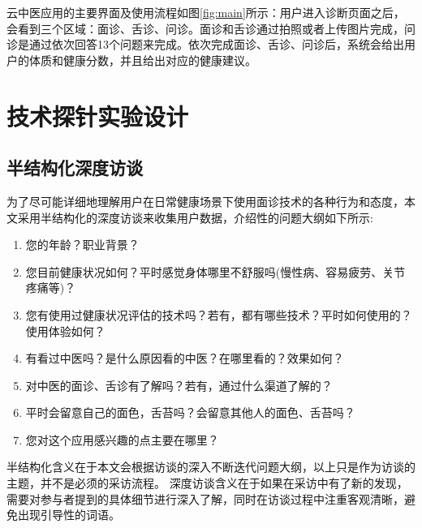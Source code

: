 云中医应用的主要界面及使用流程如图\ref{fig:main}所示：用户进入诊断页面之后，会看到三个区域：面诊、舌诊、问诊。面诊和舌诊通过拍照或者上传图片完成，问诊是通过依次回答13个问题来完成。依次完成面诊、舌诊、问诊后，系统会给出用户的体质和健康分数，并且给出对应的健康建议。

\section{技术探针实验设计}


\subsection{半结构化深度访谈}

为了尽可能详细地理解用户在日常健康场景下使用面诊技术的各种行为和态度，本文采用半结构化的深度访谈来收集用户数据\cite{DiciccoThe}，介绍性的问题大纲如下所示:
\begin{enumerate}
    \item 您的年龄？职业背景？
    \item 您目前健康状况如何？平时感觉身体哪里不舒服吗(慢性病、容易疲劳、关节疼痛等)？
    \item 您有使用过健康状况评估的技术吗？若有，都有哪些技术？平时如何使用的？使用体验如何？
    \item 有看过中医吗？是什么原因看的中医？在哪里看的？效果如何？
    \item 对中医的面诊、舌诊有了解吗？若有，通过什么渠道了解的？
    \item 平时会留意自己的面色，舌苔吗？会留意其他人的面色、舌苔吗？
    \item 您对这个应用感兴趣的点主要在哪里？
\end{enumerate}

半结构化含义在于本文会根据访谈的深入不断迭代问题大纲，以上只是作为访谈的主题，并不是必须的采访流程。
深度访谈含义在于如果在采访中有了新的发现，需要对参与者提到的具体细节进行深入了解，同时在访谈过程中注重客观清晰，避免出现引导性的词语。

